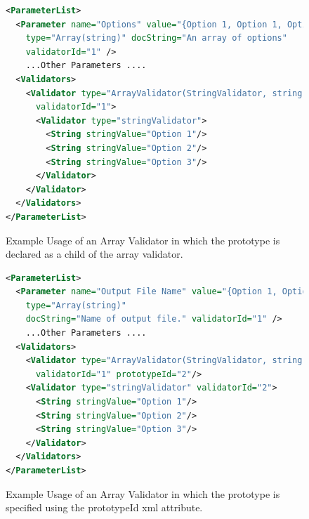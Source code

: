 \begin{figure}
\centering
\begin{lstlisting}[language=XML]
<ParameterList>
  <Parameter name="Options" value="{Option 1, Option 1, Option 1}" 
    type="Array(string)" docString="An array of options" 
    validatorId="1" />
    ...Other Parameters ....
  <Validators>
    <Validator type="ArrayValidator(StringValidator, string)" 
      validatorId="1">
      <Validator type="stringValidator">
        <String stringValue="Option 1"/>
        <String stringValue="Option 2"/>
        <String stringValue="Option 3"/>
      </Validator>
    </Validator>
  </Validators>
</ParameterList>
\end{lstlisting}
\caption{Example Usage of an Array Validator in which the prototype is declared as a child of the array validator.}
\label{actualArrayValidatorXML}
\end{figure}
\begin{figure}
\centering
\begin{lstlisting}[language=XML]
<ParameterList>
  <Parameter name="Output File Name" value="{Option 1, Option 1}" 
    type="Array(string)" 
    docString="Name of output file." validatorId="1" />
    ...Other Parameters ....
  <Validators>
    <Validator type="ArrayValidator(StringValidator, string)" 
      validatorId="1" prototypeId="2"/>
    <Validator type="stringValidator" validatorId="2">
      <String stringValue="Option 1"/>
      <String stringValue="Option 2"/>
      <String stringValue="Option 3"/>
    </Validator>
  </Validators>
</ParameterList>
\end{lstlisting}
\caption{Example Usage of an Array Validator in which the prototype is specified using the prototypeId xml attribute.}
\label{protoAttributeArrayXML}
\end{figure}

